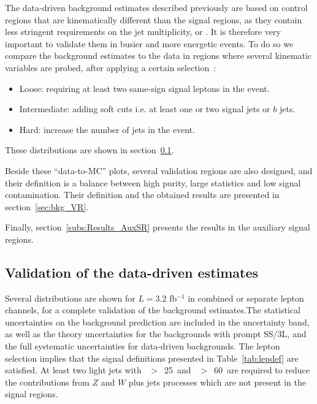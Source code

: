The data-driven background estimates described previously are based on control regions that are kinematically different than the signal regions, as they contain less stringent requirements on the jet multiplicity, \met or \meff. 
It is therefore very important to validate them in busier and more energetic events. 
To do so we compare the background estimates to the data in regions where several kinematic variables are probed, after applying a certain selection~:
\begin{itemize}
	\item{Loose: requiring at least two same-sign signal leptons in the event.}
	\item{Intermediate: adding soft cuts i.e. at least one or two signal jets or $b$ jets.}
	\item{Hard: increase the number of jets in the event.} 
\end{itemize}  
These distributions are shown in section~\ref{sec:bkg_VP_DD_estimates}.  


Beside these ``data-to-MC'' plots, several validation regions are also designed, and their definition is a balance between high purity, large statistics and low signal contamination. Their definition and the obtained results are presented in section~\ref{sec:bkg_VR}. 

Finally, section~\ref{subs:Results_AuxSR} presents the results in the auxiliary signal regions.
   
\subsection{Validation of the data-driven estimates} 
\label{sec:bkg_VP_DD_estimates}

Several distributions are shown for $L=3.2$ fb$^{-1}$ in combined or separate lepton channels, for a complete validation of the background estimates.The statistical uncertainties on the background prediction are included in the uncertainty band, as well as the theory uncertainties for the backgrounds with prompt SS/3L, and the full systematic uncertainties for data-driven backgrounds. The lepton selection implies that the signal definitions presented in Table~\ref{tab:lepdef} are satisfied. At least two light jets with \pt~$>$~25~\GeV and \met~$>$~60~\GeV are required to reduce the contributions from $Z$ and $W$ plus jets processes which are not present in the signal regions. 

